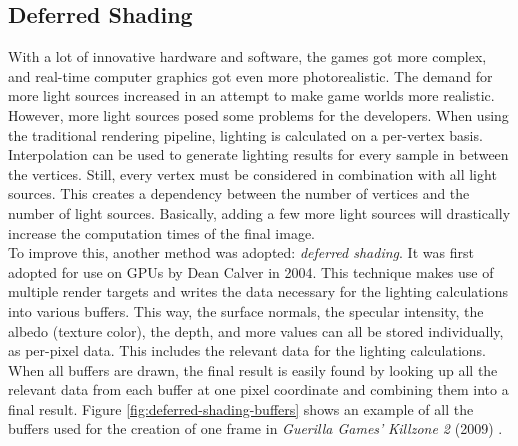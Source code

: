 \subsection*{Deferred Shading} \label{subsec-deferred-rendering}

With a lot of innovative hardware and software, the games got more complex, and real-time computer graphics got even 
more photorealistic. The demand for more light sources increased in an attempt to make game worlds more realistic. 
However, more light sources posed some problems for the developers. When using the traditional rendering pipeline, 
lighting is calculated on a per-vertex basis. Interpolation can be used to generate lighting results for every sample 
in between the vertices. Still, every vertex must be considered in combination with all light sources. This creates a 
dependency between the number of vertices and the number of light sources. Basically, adding a few more light sources 
will drastically increase the computation times of the final image. \\

\noindent
To improve this, another method was adopted: \emph{deferred shading}. It was first adopted for use on \ac{GPU}s 
by Dean Calver \cite{Calver2004} in 2004. This technique makes use of multiple render targets and writes the data 
necessary for the lighting calculations into various buffers. This way, the surface normals, the specular intensity, 
the albedo (texture color), the depth, and more values can all be stored individually, as per-pixel data. This includes 
the relevant data for the lighting calculations. When all buffers are drawn, the final result is easily found by 
looking up all the relevant data from each buffer at one pixel coordinate and combining them into a final result. 
Figure \ref{fig:deferred-shading-buffers} shows an example of all the buffers used for the creation of one frame in 
\emph{Guerilla Games'} \emph{Killzone 2} (2009) \cite{KillzoneFandom}. 

